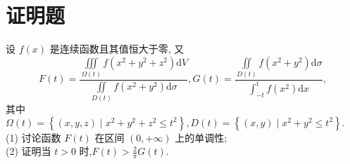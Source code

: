 \documentclass[twocolumn,UTF8]{ctexart}
\begin{document}
\newpage
\section{证明题}
设 $f(x)$ 是连续函数且其值恒大于零, 又
$$
F(t)=\frac{\displaystyle\iiint\limits_{\Omega(t)} f\left(x^{2}+y^{2}+z^{2}\right) \mathrm{d} V}{\displaystyle\iint\limits_{D(t)} f\left(x^{2}+y^{2}\right) \mathrm{d} \sigma}, G(t)=\frac{\displaystyle\iint\limits_{D(t)} f\left(x^{2}+y^{2}\right) \mathrm{d} \sigma}{\displaystyle\int_{-t}^{t} f\left(x^{2}\right) \mathrm{d} x},
$$
其中 $\Omega(t)=\left\{(x, y, z) \mid x^{2}+y^{2}+z^{2} \leqslant t^{2}\right\}, D(t)=\left\{(x, y) \mid x^{2}+y^{2} \leqslant t^{2}\right\}.$\\
(1) 讨论函数 $F(t)$ 在区间 $(0,+\infty)$ 上的单调性;\\
(2) 证明当 $t>0$ 时,$F(t)>\frac{2}{\pi} G(t)$.
\end{document}
